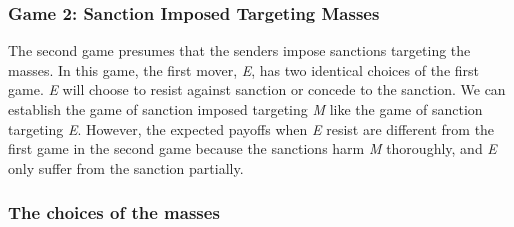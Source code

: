 \documentclass[11pt, letterpage]{article}
\begin{document}

	
\subsubsection*{Game 2: Sanction Imposed Targeting Masses}
\begin{center}
	
\end{center}

The second game presumes that the senders impose sanctions targeting the masses. In this game, the first mover, \textit{E}, has two identical choices of the first game. \textit{E} will choose to resist against sanction or concede to the sanction. We can establish the game of sanction imposed targeting \textit{M} like the game of sanction targeting \textit{E}. However, the expected payoffs when \textit{E} resist are different from the first game in the second game because the sanctions harm \textit{M} thoroughly, and \textit{E} only suffer from the sanction partially.
		
\subsubsection*{The choices of the masses}
	
\end{document}
